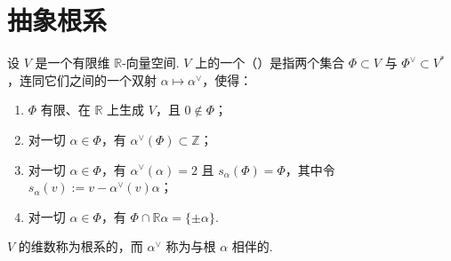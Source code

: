 \section{抽象根系}\label{sec:ssl-3-2}
\begin{definition}\label{def:ssl-3-2-1}
设 $V$ 是一个有限维 $\mathbb{R}$-向量空间. $V$ 上的一个（）是指两个集合 $\Phi\subset V$ 与 $\Phi^{\vee}\subset V^{*}$，连同它们之间的一个双射 $\alpha\mapsto\alpha^{\vee}$，使得：
\begin{enumerate}[label=\roman*)]
\item $\Phi$ 有限、在 $\mathbb{R}$ 上生成 $V$，且 $0\notin\Phi$；
\item 对一切 $\alpha\in\Phi$，有 $\alpha^{\vee}(\Phi)\subset\mathbb{Z}$；
\item 对一切 $\alpha\in\Phi$，有 $\alpha^{\vee}(\alpha)=2$ 且 $s_{\alpha}(\Phi)=\Phi$，其中令 $s_{\alpha}(v):=v-\alpha^{\vee}(v)\alpha$；
\item 对一切 $\alpha\in\Phi$，有 $\Phi\cap\mathbb{R}\alpha=\{\pm\alpha\}$.
\end{enumerate}
$V$ 的维数称为根系的，而 $\alpha^{\vee}$ 称为与根 $\alpha$ 相伴的.
\end{definition}
